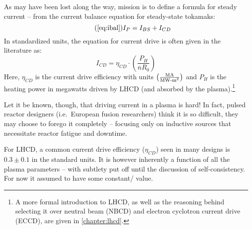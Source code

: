 As may have been lost along the way,  mission is to define a formula for steady current -- from the current balance equation for steady-state tokamaks:
\begin{equation}
		\tag{\ref{eq:ibal}}
		I_P = I_{BS} + I_{CD}
\end{equation}
In standardized units, the equation for current drive is often given in the literature as: \cite{itercd}
\begin{equation}
	I_{CD} = \eta_{CD} \cdot \left( \frac{P_H}{\overline n R_0} \right)
\end{equation}
Here, $\eta_{CD}$ is the current drive efficiency with units $ \left(
\frac{ \textnormal{MA} }{ \textnormal{MW-m}^2 } \right) $ and $P_H$ is the heating power in megawatts driven by LHCD (and absorbed by the plasma).\footnote{A more formal introduction to LHCD, as well as the reasoning behind selecting it over neutral beam (NBCD) and electron cyclotron current drive (ECCD), are given in \cref{chapter:lhcd}. }

Let it be known, though, that driving current in a plasma is hard! In fact, pulsed reactor designers (i.e.\ European fusion researchers) think it is so difficult, they may choose to forego it completely -- focusing only on inductive sources that necessitate reactor fatigue and downtime.

For LHCD, a common current drive efficiency ($\eta_{CD}$) seen in many designs is $0.3 \pm 0.1 $ in the standard units.\cite{itercd,arc,ussteady} It is however inherently a function of all the plasma parameters -- with subtlety put off until the discussion of self-consistency. For now it assumed to have some constant/ value.

